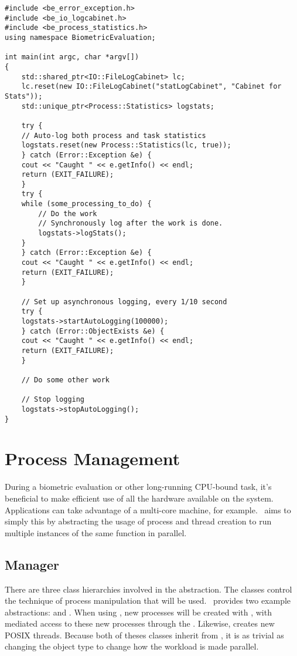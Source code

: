 \begin{lstlisting}[caption={Logging Process Statistics}, label=lst:processstatisticslogging]
#include <be_error_exception.h>
#include <be_io_logcabinet.h>
#include <be_process_statistics.h>
using namespace BiometricEvaluation;

int main(int argc, char *argv[])
{
    std::shared_ptr<IO::FileLogCabinet> lc;
    lc.reset(new IO::FileLogCabinet("statLogCabinet", "Cabinet for Stats"));
    std::unique_ptr<Process::Statistics> logstats;

    try {
	// Auto-log both process and task statistics
	logstats.reset(new Process::Statistics(lc, true));
    } catch (Error::Exception &e) {
	cout << "Caught " << e.getInfo() << endl;
	return (EXIT_FAILURE);
    }
    try {
	while (some_processing_to_do) {
	    // Do the work
	    // Synchronously log after the work is done.
	    logstats->logStats();
	}
    } catch (Error::Exception &e) {
	cout << "Caught " << e.getInfo() << endl;
	return (EXIT_FAILURE);
    }

    // Set up asynchronous logging, every 1/10 second
    try {
	logstats->startAutoLogging(100000);
    } catch (Error::ObjectExists &e) {
	cout << "Caught " << e.getInfo() << endl;
	return (EXIT_FAILURE);
    }

    // Do some other work

    // Stop logging
    logstats->stopAutoLogging();
}
\end{lstlisting}

\section{Process Management}
\label{sec-process_management}

During a biometric evaluation or other long-running CPU-bound task, it's 
beneficial to make efficient use of all the hardware available on the system.
Applications can take advantage of a multi-core machine, for example.
\sname\ aims to simply this by abstracting the usage of process and thread
creation to run multiple instances of the same function in parallel.

\subsection{Manager}
\label{subsec-process_manager}

There are three class hierarchies involved in the abstraction.  
The  classes control the
technique of process manipulation that will be used.  \sname\ provides two
example abstractions:  and
.  When
using , new processes will be created with 
, with mediated access to these new processes through the
.  Likewise, 
creates new POSIX threads.  Because both of theses classes inherit from
, it is as trivial as changing the  object type
to change how the workload is made parallel.

